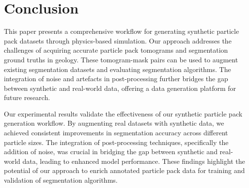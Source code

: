\documentclass[preprint,12pt]{elsarticle}
\begin{document}
\section{Conclusion}
This paper presents a comprehensive workflow for generating synthetic particle pack datasets through physics-based simulation. 
Our approach addresses the challenges of acquiring accurate particle pack tomograms and segmentation ground truths in geology. 
These tomogram-mask pairs can be used to augment existing segmentation datasets and evaluating segmentation algorithms. 
The integration of noise and artefacts in post-processing further bridges the gap between synthetic and real-world data, offering a data generation platform for future research. 
\par
Our experimental results validate the effectiveness of our synthetic particle pack generation workflow. 
By augmenting real datasets with synthetic data, we achieved consistent improvements in segmentation accuracy across different particle sizes. 
The integration of post-processing techniques, specifically the addition of noise, was crucial in bridging the gap between synthetic and real-world data, leading to enhanced model performance. 
These findings highlight the potential of our approach to enrich annotated particle pack data for training and validation of segmentation algorithms.

\end{document}
